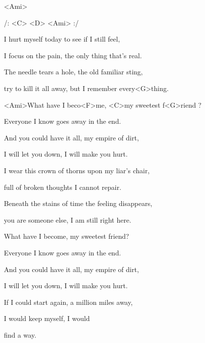 

<Ami>

/: <C> <D> <Ami> :/

\zs
I hurt myself today to see if I still feel, 

I focus on the pain, the only thing that's real.

The needle tears a hole, the old familiar sting,

try to kill it all away, but I remember every<G>thing. 
\ks

\zr
<Ami>What have I beco<F>me, <C>my sweetest f<G>riend ?

Everyone I know goes away in the end.

And you could have it all, my empire of dirt,

I will let you down, I will make you hurt. 
\kr

\zs
I wear this crown of thorns upon my liar's chair,

full of broken thoughts I cannot repair.

Beneath the stains of time the feeling disappears,

you are someone else, I am still right here. 
\ks

\zr
What have I become,  my sweetest friend?

Everyone I know goes away in the end.

And you could have it all, my empire of dirt,

I will let you down, I will make you hurt. 

If I could start again, a million miles away,

I would keep myself, I would  

find a way.
\kr

\kp
